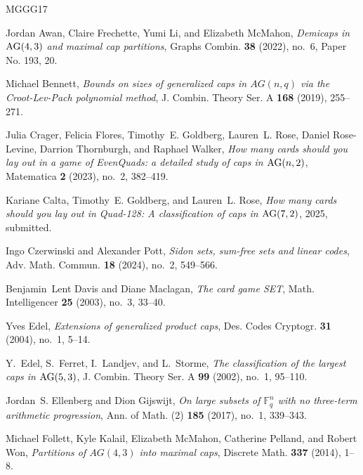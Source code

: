 \documentclass[12pt]{amsart}
\theoremstyle{definition}
\begin{document}
\begin{thebibliography}{MGGG17}

Jordan Awan, Claire Frechette, Yumi Li, and Elizabeth McMahon, \emph{Demicaps
  in {${\rm AG}(4,3)$} and maximal cap partitions}, Graphs Combin. \textbf{38}
  (2022), no.~6, Paper No. 193, 20.

Michael Bennett, \emph{Bounds on sizes of generalized caps in {$AG(n,q)$} via
  the {C}root-{L}ev-{P}ach polynomial method}, J. Combin. Theory Ser. A
  \textbf{168} (2019), 255--271.

Julia Crager, Felicia Flores, Timothy~E. Goldberg, Lauren~L. Rose, Daniel
  Rose-Levine, Darrion Thornburgh, and Raphael Walker, \emph{How many cards
  should you lay out in a game of {E}ven{Q}uads: a detailed study of caps in
  {${\rm AG}(n,2)$}}, Matematica \textbf{2} (2023), no.~2, 382--419.

Kariane Calta, Timothy~E. Goldberg, and Lauren~L. Rose, \emph{How many cards
  should you lay out in {Q}uad-128: A classification of caps in {${\rm
  AG}(7,2)$}}, 2025, submitted.

Ingo Czerwinski and Alexander Pott, \emph{Sidon sets, sum-free sets and linear
  codes}, Adv. Math. Commun. \textbf{18} (2024), no.~2, 549--566.

Benjamin~Lent Davis and Diane Maclagan, \emph{The card game {SET}}, Math.
  Intelligencer \textbf{25} (2003), no.~3, 33--40.

Yves Edel, \emph{Extensions of generalized product caps}, Des. Codes Cryptogr.
  \textbf{31} (2004), no.~1, 5--14.

Y.~Edel, S.~Ferret, I.~Landjev, and L.~Storme, \emph{The classification of the
  largest caps in {$\rm AG(5,3)$}}, J. Combin. Theory Ser. A \textbf{99}
  (2002), no.~1, 95--110.

Jordan~S. Ellenberg and Dion Gijswijt, \emph{On large subsets of
  {$\mathbb{F}^n_q$} with no three-term arithmetic progression}, Ann. of Math.
  (2) \textbf{185} (2017), no.~1, 339--343.

Michael Follett, Kyle Kalail, Elizabeth McMahon, Catherine Pelland, and Robert
  Won, \emph{Partitions of {$AG(4,3)$} into maximal caps}, Discrete Math.
  \textbf{337} (2014), 1--8.


\end{thebibliography}
\end{document}
